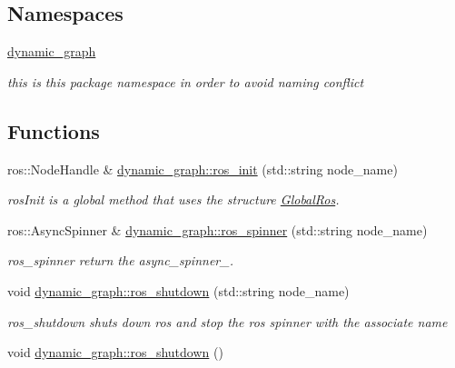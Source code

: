 \subsection*{Namespaces}
\begin{DoxyCompactItemize}
\item 
 \hyperlink{namespacedynamic__graph}{dynamic\+\_\+graph}
\begin{DoxyCompactList}\small\item\em this is this package namespace in order to avoid naming conflict \end{DoxyCompactList}\end{DoxyCompactItemize}
\subsection*{Functions}
\begin{DoxyCompactItemize}
\item 
ros\+::\+Node\+Handle \& \hyperlink{namespacedynamic__graph_ab01ece41a91a029cf335e28548cdfc06}{dynamic\+\_\+graph\+::ros\+\_\+init} (std\+::string node\+\_\+name)
\begin{DoxyCompactList}\small\item\em ros\+Init is a global method that uses the structure \hyperlink{structdynamic__graph_1_1GlobalRos}{Global\+Ros}. \end{DoxyCompactList}\item 
ros\+::\+Async\+Spinner \& \hyperlink{namespacedynamic__graph_a0ab97e95b56e05d30fd3112f8dfcf8eb}{dynamic\+\_\+graph\+::ros\+\_\+spinner} (std\+::string node\+\_\+name)
\begin{DoxyCompactList}\small\item\em ros\+\_\+spinner return the async\+\_\+spinner\+\_\+. \end{DoxyCompactList}\item 
void \hyperlink{namespacedynamic__graph_a0a7d6cd6c123bd1852af188fc06ce4f7}{dynamic\+\_\+graph\+::ros\+\_\+shutdown} (std\+::string node\+\_\+name)\hypertarget{namespacedynamic__graph_a0a7d6cd6c123bd1852af188fc06ce4f7}{}\label{namespacedynamic__graph_a0a7d6cd6c123bd1852af188fc06ce4f7}

\begin{DoxyCompactList}\small\item\em ros\+\_\+shutdown shuts down ros and stop the ros spinner with the associate name \end{DoxyCompactList}\item 
void \hyperlink{namespacedynamic__graph_a7d2045abc7e02fe4ee746c5cbb937b04}{dynamic\+\_\+graph\+::ros\+\_\+shutdown} ()\hypertarget{namespacedynamic__graph_a7d2045abc7e02fe4ee746c5cbb937b04}{}\label{namespacedynamic__graph_a7d2045abc7e02fe4ee746c5cbb937b04}


\end{DoxyCompactItemize}
